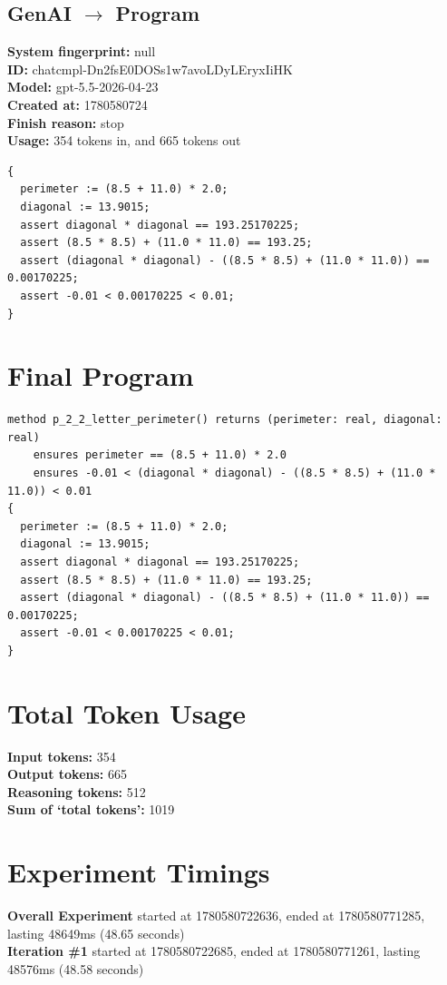 \documentclass{article}
\begin{document}
\subsection*{GenAI $\rightarrow$ Program}
\textbf{System fingerprint: }null
\\\textbf{ID: }chatcmpl-Dn2fsE0DOSs1w7avoLDyLEryxIiHK
\\\textbf{Model: }gpt-5.5-2026-04-23
\\\textbf{Created at: }1780580724
\\\textbf{Finish reason: }stop
\\\textbf{Usage: }354 tokens in, and 665 tokens out
\begin{lstlisting}
{
  perimeter := (8.5 + 11.0) * 2.0;
  diagonal := 13.9015;
  assert diagonal * diagonal == 193.25170225;
  assert (8.5 * 8.5) + (11.0 * 11.0) == 193.25;
  assert (diagonal * diagonal) - ((8.5 * 8.5) + (11.0 * 11.0)) == 0.00170225;
  assert -0.01 < 0.00170225 < 0.01;
}
\end{lstlisting}
\section*{Final Program}
\begin{lstlisting}
method p_2_2_letter_perimeter() returns (perimeter: real, diagonal: real)
	ensures perimeter == (8.5 + 11.0) * 2.0
	ensures -0.01 < (diagonal * diagonal) - ((8.5 * 8.5) + (11.0 * 11.0)) < 0.01
{
  perimeter := (8.5 + 11.0) * 2.0;
  diagonal := 13.9015;
  assert diagonal * diagonal == 193.25170225;
  assert (8.5 * 8.5) + (11.0 * 11.0) == 193.25;
  assert (diagonal * diagonal) - ((8.5 * 8.5) + (11.0 * 11.0)) == 0.00170225;
  assert -0.01 < 0.00170225 < 0.01;
}
\end{lstlisting}
\section*{Total Token Usage}
\textbf{Input tokens: }354
\\\textbf{Output tokens: }665
\\\textbf{Reasoning tokens: }512
\\\textbf{Sum of `total tokens': }1019
\section*{Experiment Timings}
\textbf{Overall Experiment} started at 1780580722636, ended at 1780580771285, lasting 48649ms (48.65 seconds)
\\\textbf{Iteration \#1} started at 1780580722685, ended at 1780580771261, lasting 48576ms (48.58 seconds)
\end{document}
